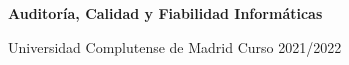 

\usepackage{pgf}
\usepackage{tikz}
\usepackage{url}
\usepackage{hyperref}
\usepackage{xcolor,colortbl}


\usepackage{wasysym}

\setlength{\marginparwidth}{1.2in}
\let\oldmarginpar\marginpar
\renewcommand\marginpar[1]{\-\oldmarginpar[\raggedleft #1]%
{\raggedright #1}}

\newenvironment{checklist}{%
  \begin{list}{}{}%
  \let\olditem\item
  \renewcommand\item{\olditem -- \marginpar{$\Box$} }
  \newcommand\checkeditem{\olditem -- \marginpar{$\CheckedBox$} }
}{%
  \end{list}
}



\begin{center}
{\Large\textbf{Auditor\'ia, Calidad y Fiabilidad Inform\'aticas}}
\smallskip

\large
Universidad Complutense de Madrid \qquad Curso 2021/2022
\medskip

\end{center}


